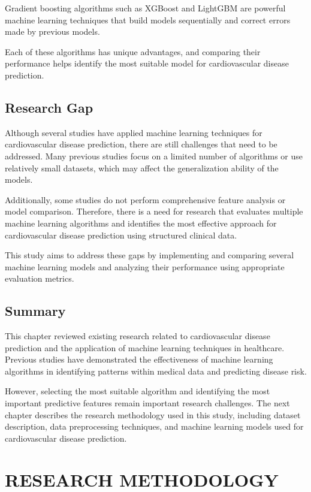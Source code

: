 Gradient boosting algorithms such as XGBoost and LightGBM are powerful machine learning techniques that build models sequentially and correct errors made by previous models.

Each of these algorithms has unique advantages, and comparing their performance helps identify the most suitable model for cardiovascular disease prediction.

\section{Research Gap}

Although several studies have applied machine learning techniques for cardiovascular disease prediction, there are still challenges that need to be addressed. Many previous studies focus on a limited number of algorithms or use relatively small datasets, which may affect the generalization ability of the models.

Additionally, some studies do not perform comprehensive feature analysis or model comparison. Therefore, there is a need for research that evaluates multiple machine learning algorithms and identifies the most effective approach for cardiovascular disease prediction using structured clinical data.

This study aims to address these gaps by implementing and comparing several machine learning models and analyzing their performance using appropriate evaluation metrics.

\section{Summary}

This chapter reviewed existing research related to cardiovascular disease prediction and the application of machine learning techniques in healthcare. Previous studies have demonstrated the effectiveness of machine learning algorithms in identifying patterns within medical data and predicting disease risk.

However, selecting the most suitable algorithm and identifying the most important predictive features remain important research challenges. The next chapter describes the research methodology used in this study, including dataset description, data preprocessing techniques, and machine learning models used for cardiovascular disease prediction.

\chapter{RESEARCH METHODOLOGY}

